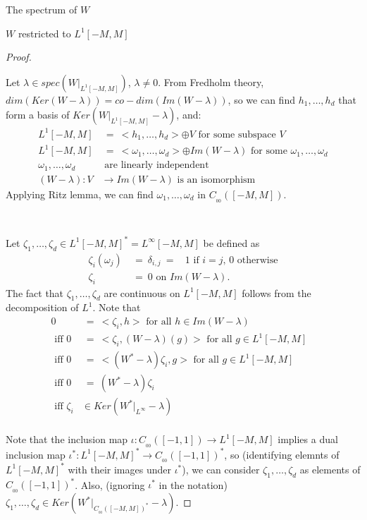 \documentclass[12pt]{article}
\begin{document}
\begin{section}{The spectrum of $W$ }
\begin{subsection}{$W$ restricted to $L^1[-M,M]$ }
\begin{proof}
\

Let $\lambda \in spec(W\Big|_{L^1[-M,M]})$, $\lambda \ne 0$. From Fredholm theory, $dim(Ker(W-\lambda)) = co-dim(Im(W-\lambda))$, so we can find $h_1,\dots,h_d$ that form a basis of $Ker \left( W\Big|_{L^1[-M,M]} - \lambda \right) $, and:
\begin{align*}
L^1[-M,M] &~=~ <h_1,\dots,h_d> \oplus V  \text{ for some subspace $V$ } \\
L^1[-M,M] &~=~ <\omega_1,\dots,\omega_d> \oplus Im(W - \lambda) \text{ for some }\omega_1,\dots,\omega_d\\
\omega_1,\dots,\omega_d &\text{ are linearly independent} \\
(W - \lambda):V &\longrightarrow Im(W - \lambda) \text{   is an isomorphism}
\end{align*}
Applying Ritz lemma, we can find   $\omega_1,\dots,\omega_d$ in  $C_{_{00}}([-M,M])$.
\

\

Let $\zeta_1,\dots,\zeta_d \in L^1[-M,M]^* = L^{\infty}[-M,M]$ be defined as
\begin{align*}
\zeta_i(\omega_j) &~=~ \delta_{i,j} ~=~ \text{ $1$ if $i=j$, $0$ otherwise} \\
\zeta_i &~=~ 0 \text{ on }Im(W - \lambda).
\end{align*}
The fact that $\zeta_1,\dots,\zeta_d$ are continuous on $L^1[-M,M]$ follows from the decomposition of $L^1$. 
Note that 
\begin{align*}
0 &~=~ <\zeta_i, h> \text{ for all } h \in Im(W - \lambda) &\\
\text{ iff } 
0 &~=~ <\zeta_i, (W-\lambda)(g)> \text{ for all } g \in L^1[-M,M] &\\
\text{ iff } 
0 &~=~ <(W^*-\lambda)\zeta_i, g> \text{ for all } g \in L^1[-M,M] &\\
\text{ iff } 0 &~=~ (W^*-\lambda)\zeta_i   &\\
\text{ iff } \zeta_i &\in Ker(W^*\Big|_{L^{\infty}}-\lambda)   &\\
\end{align*}

Note that the inclusion map $\iota: C_{_{00}}([-1,1]) \longrightarrow L^1[-M,M]$ implies a dual inclusion map $\iota^*: L^1[-M,M]^*  \longrightarrow C_{_{00}}([-1,1])^*$, so (identifying elemnts of $L^1[-M,M]^*$ with their images under $\iota^*$), we can consider $\zeta_1,\dots,\zeta_d$ as elements of $C_{_{00}}([-1,1])^*$. Also, (ignoring $\iota^*$ in the notation) $\zeta_1,\dots,\zeta_d \in Ker\left( W^*\Big|_{C_{_{00}}([-M,M])^*} - \lambda \right)$.


\end{proof}
\end{subsection}
\end{section}
\end{document}
